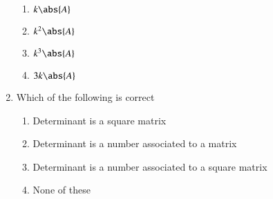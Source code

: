 \documentclass{article}
\theoremstyle{remark}
\begin{document}
\begin{enumerate}[resume]
\begin{enumerate}[label=(\roman*)]
\item $k \abs{A}$
\item $k^2 \abs{A}$
\item $k^3 \abs{A}$
\item $3k \abs{A}$
\end{enumerate}
\item Which of the following is correct 
\begin{enumerate}
\item Determinant is a square matrix
\item Determinant is a number associated to a matrix
\item Determinant is a number associated to a square matrix
\item None of these
\end{enumerate}
\end{enumerate}
\end{document}

